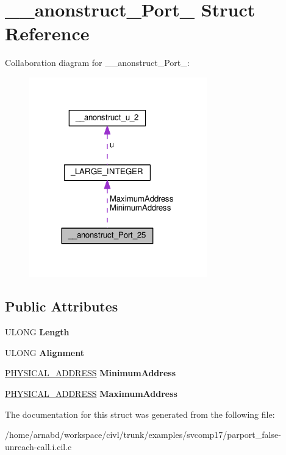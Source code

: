 \hypertarget{struct____anonstruct__Port__25}{}\section{\+\_\+\+\_\+anonstruct\+\_\+\+Port\+\_ Struct Reference}
\label{struct____anonstruct__Port__25}


Collaboration diagram for \+\_\+\+\_\+anonstruct\+\_\+\+Port\+\_\+:
\nopagebreak
\begin{figure}[H]
\begin{center}
\leavevmode
\includegraphics[width=218pt]{struct____anonstruct__Port__25__coll__graph}
\end{center}
\end{figure}
\subsection*{Public Attributes}
\begin{DoxyCompactItemize}
\item 
\hypertarget{struct____anonstruct__Port__25_a82fccc490696e27f58ccfa8d0bd74fa9}{}U\+L\+O\+N\+G {\bfseries Length}\label{struct____anonstruct__Port__25_a82fccc490696e27f58ccfa8d0bd74fa9}

\item 
\hypertarget{struct____anonstruct__Port__25_a5247a4ecf0d3712d5749b46e3ba7c3b0}{}U\+L\+O\+N\+G {\bfseries Alignment}\label{struct____anonstruct__Port__25_a5247a4ecf0d3712d5749b46e3ba7c3b0}

\item 
\hypertarget{struct____anonstruct__Port__25_a8847c13855ed7d34097bd92fd47df104}{}\hyperlink{union__LARGE__INTEGER}{P\+H\+Y\+S\+I\+C\+A\+L\+\_\+\+A\+D\+D\+R\+E\+S\+S} {\bfseries Minimum\+Address}\label{struct____anonstruct__Port__25_a8847c13855ed7d34097bd92fd47df104}

\item 
\hypertarget{struct____anonstruct__Port__25_af12b434997eeddc2fb800bc52c9bcd1b}{}\hyperlink{union__LARGE__INTEGER}{P\+H\+Y\+S\+I\+C\+A\+L\+\_\+\+A\+D\+D\+R\+E\+S\+S} {\bfseries Maximum\+Address}\label{struct____anonstruct__Port__25_af12b434997eeddc2fb800bc52c9bcd1b}

\end{DoxyCompactItemize}


The documentation for this struct was generated from the following file\+:\begin{DoxyCompactItemize}
\item 
/home/arnabd/workspace/civl/trunk/examples/svcomp17/parport\+\_\+false-\/unreach-\/call.\+i.\+cil.\+c\end{DoxyCompactItemize}
